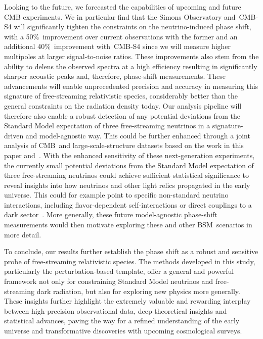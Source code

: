 \documentclass[11pt]{article}
\numberwithin{equation}{section}
\begin{document}
Looking to the future, we forecasted the capabilities of upcoming and future CMB experiments. We in particular find that the Simons Observatory and~\mbox{CMB-S4} will significantly tighten the constraints on the neutrino-induced phase shift, with a 50\%~improvement over current observations with the former and an additional 40\%~improvement with~\mbox{CMB-S4} since we will measure higher multipoles at larger signal-to-noise ratios. These improvements also stem from the ability to delens the observed spectra at a high efficiency resulting in significantly sharper acoustic peaks and, therefore, phase-shift measurements. These advancements will enable unprecedented precision and accuracy in measuring this signature of free-streaming relativistic species, considerably better than the general constraints on the radiation density today. Our analysis pipeline will therefore also enable a robust detection of any potential deviations from the Standard Model expectation of three free-streaming neutrinos in a signature-driven and model-agnostic way. This could be further enhanced through a joint analysis of CMB~and large-scale-structure datasets based on the work in this paper and~\cite{Baumann:2017gkg, Baumann:2019keh, Whitford:2024ecj}. With the enhanced sensitivity of these next-generation experiments, the currently small potential deviations from the Standard Model expectation of three free-streaming neutrinos could achieve sufficient statistical significance to reveal insights into how neutrinos and other light relics propagated in the early universe. This could for example point to specific non-standard neutrino interactions, including flavor-dependent self-interactions or direct couplings to a dark sector~\cite{Jeong:2013eza, Chacko:2016kgg, Buen-Abad:2017gxg, Green:2021gdc, Berryman:2022hds, Adshead:2022ovo, Buen-Abad:2024tlb, Kaplan:2024ydw}. More generally, these future model-agnostic phase-shift measurements would then motivate exploring these and other BSM~scenarios in more detail.\medskip

To conclude, our results further establish the phase shift as a robust and sensitive probe of free-streaming relativistic species. The methods developed in this study, particularly the perturbation-based template, offer a general and powerful framework not only for constraining Standard Model neutrinos and free-streaming dark radiation, but also for exploring new physics more generally. These insights further highlight the extremely valuable and rewarding interplay between high-precision observational data, deep theoretical insights and statistical advances, paving the way for a refined understanding of the early universe and transformative discoveries with upcoming cosmological surveys.
\end{document}

